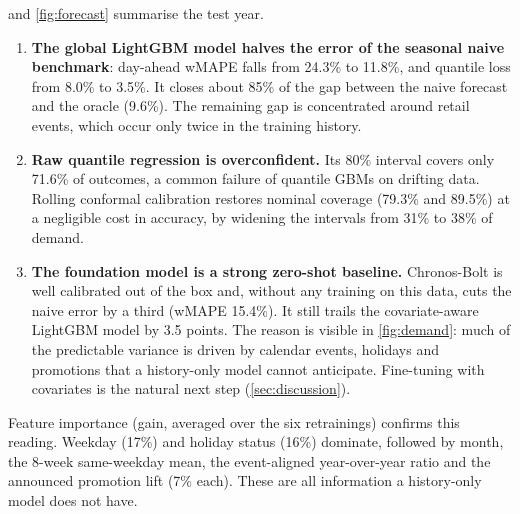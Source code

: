  and \cref{fig:forecast} summarise the test year.
\begin{enumerate}
  \item \textbf{The global LightGBM model halves the error of the seasonal naive benchmark}: day-ahead wMAPE falls from 24.3\% to 11.8\%, and quantile loss from 8.0\% to 3.5\%. It closes about 85\% of the gap between the naive forecast and the oracle (9.6\%). The remaining gap is concentrated around retail events, which occur only twice in the training history.
  \item \textbf{Raw quantile regression is overconfident.} Its 80\% interval covers only 71.6\% of outcomes, a common failure of quantile GBMs on drifting data. Rolling conformal calibration restores nominal coverage (79.3\% and 89.5\%) at a negligible cost in accuracy, by widening the intervals from 31\% to 38\% of demand.
  \item \textbf{The foundation model is a strong zero-shot baseline.} Chronos-Bolt is well calibrated out of the box and, without any training on this data, cuts the naive error by a third (wMAPE 15.4\%). It still trails the covariate-aware LightGBM model by 3.5 points. The reason is visible in \cref{fig:demand}: much of the predictable variance is driven by calendar events, holidays and promotions that a history-only model cannot anticipate. Fine-tuning with covariates is the natural next step (\cref{sec:discussion}).
\end{enumerate}
Feature importance (gain, averaged over the six retrainings) confirms this reading. Weekday (17\%) and holiday status (16\%) dominate, followed by month, the 8-week same-weekday mean, the event-aligned year-over-year ratio and the announced promotion lift (7\% each). These are all information a history-only model does not have.


